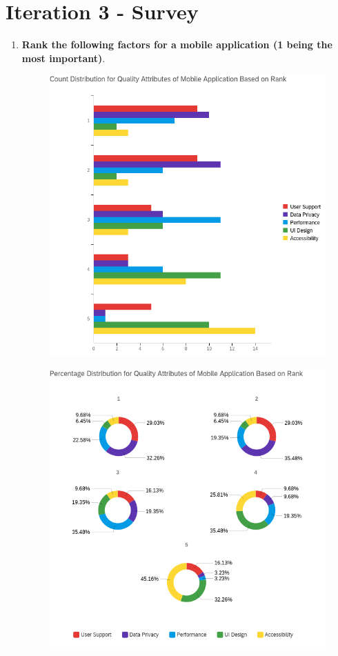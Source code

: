 \section{Iteration 3 - Survey} \label{appendix:iter3-survey}

\begin{enumerate}
  \item \textbf{Rank the following factors for a mobile application (1 being the most
  important)}.
  \begin{figure}[H]
    \centering
    \includegraphics[width=\linewidth]{img/prototype/app3-1.png}
  \end{figure}
  \begin{figure}[H]
    \centering
    \includegraphics[width=\linewidth]{img/prototype/app3-2.png}

\end{figure}
\end{enumerate}
